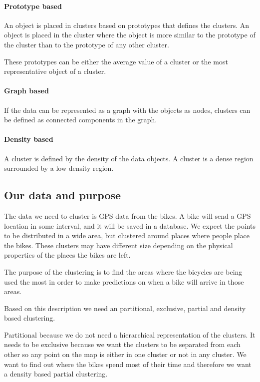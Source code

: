 \paragraph{Prototype based}
An object is placed in clusters based on prototypes that defines the clusters.
An object is placed in the cluster where the object is more similar to the prototype of the cluster than to the prototype of any other cluster.

These prototypes can be either the average value of a cluster or the most representative object of a cluster.

\paragraph{Graph based}
If the data can be represented as a graph with the objects as nodes, clusters can be defined as connected components in the graph.

\paragraph{Density based}
A cluster is defined by the density of the data objects.
A cluster is a dense region surrounded by a low density region.

\subsection{Our data and purpose}
The data we need to cluster is GPS data from the bikes.
A bike will send a GPS location in some interval, and it will be saved in a database.
We expect the points to be distributed in a wide area, but clustered around places where people place the bikes.
These clusters may have different size depending on the physical properties of the places the bikes are left.

The purpose of the clustering is to find the areas where the bicycles are being used the most in order to make predictions on when a bike will arrive in those areas.

Based on this description we need an partitional, exclusive, partial and density based clustering.

Partitional because we do not need a hierarchical representation of the clusters.
It needs to be exclusive because we want the clusters to be separated from each other so any point on the map is either in one cluster or not in any cluster.
We want to find out where the bikes spend most of their time and therefore we want a density based partial clustering.

